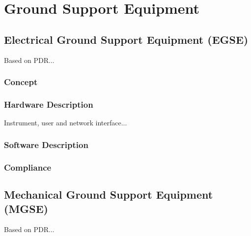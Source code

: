 \chapter{Ground Support Equipment}
\label{chap:ground_support}

\section{Electrical Ground Support Equipment (EGSE)}

Based on PDR...

\subsection{Concept}

\subsection{Hardware Description}

Instrument, user and network interface...

\subsection{Software Description}

\subsection{Compliance}

\section{Mechanical Ground Support Equipment (MGSE)}

Based on PDR...